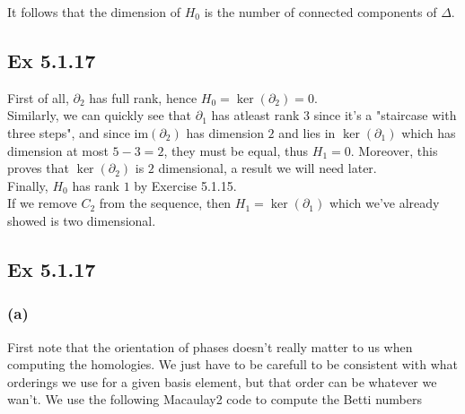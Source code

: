 \documentclass{article}
\theoremstyle{definition}
\newcommand{\im}{\text{im}}
\begin{document}
It follows that the dimension of $H_0$ is the number of connected components 
of $\Delta$.

\subsection*{Ex 5.1.17}

First of all, $\partial_2$ has full rank, hence $H_0 = \ker(\partial_2) =
0$. \\

Similarly, we can quickly see that $\partial_1$ has atleast rank $3$ since
it's a "staircase with three steps", and since $\im(\partial_2)$ has dimension
$2$ and lies in $\ker(\partial_1)$ which has dimension at most $5 - 3 = 2$,
they must be equal, thus $H_1 = 0$. Moreover, this proves that
$\ker(\partial_2)$ is $2$ dimensional, a result we will need later. \\

Finally, $H_0$ has rank $1$ by Exercise 5.1.15. \\

If we remove $C_2$ from the sequence, then $H_1 = \ker(\partial_1)$ which we've
already showed is two dimensional.

\subsection*{Ex 5.1.17}

\subsubsection*{(a)}

First note that the orientation of phases doesn't really matter to us when
computing the homologies. We just have to be carefull to be consistent with
what orderings we use for a given basis element, but that order can be whatever
we wan't. We use the following Macaulay2 code to compute the Betti numbers
\end{document}
